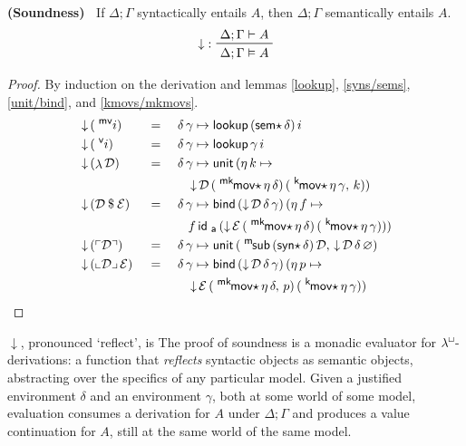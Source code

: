 \documentclass{entcs}
\numberwithin{equation}{thm}
\newcommand{\lambdabox}{\lambda^{\mkern-1mu\sq\mkern-2mu}}
\newcommand{\tsf}[1]{\textsf{\upshape{#1}}}
\newcommand{\stsf}[1]{\tsf{\small{#1}}}
\renewcommand{\:}{\mathrel{:}}
\newcommand{\tyrule}[1]{\prftree[l]{${#1} \:\,$}}
\newcommand{\0}{\varnothing}
\newcommand{\sq}{\Box}
\newcommand{\D}{\mathcal{D}}
\newcommand{\E}{\mathcal{E}}
\renewcommand{\e}{\mathrel{\vdash}}
\newcommand{\mvar}{\operatorname{^{\stsf{mv}\mkern-4mu}}}
\newcommand{\var}{\operatorname{^{\stsf{v}\mkern-4mu}}}
\newcommand{\lam}{\operatorname{\lambda}}
\newcommand{\app}{\mathbin{\$}}
\newcommand{\quo}[1]{\mathopen{\ulcorner}{#1}\mathclose{\urcorner}}
\newcommand{\unq}[1]{\mathopen{\llcorner}{#1}\mathclose{\lrcorner}\,}
\newcommand{\msub}{\operatorname{^{\stsf{m}\mkern-2mu}\tsf{sub}}}
\newcommand{\ida}{\operatorname{\tsf{id}_{\stsf{a}}}}
\newcommand{\syns}{\operatorname{\tsf{syn}\star}}
\newcommand{\sems}{\operatorname{\tsf{sem}\star}}
\newcommand{\eeq}{\mathrel{\vDash}}
\newcommand{\kmovs}{\operatorname{^{\stsf{k}\mkern-2mu}\tsf{mov}\star}}
\newcommand{\mkmovs}{\operatorname{^{\stsf{mk}\mkern-2mu}\tsf{mov}\star}}
\newcommand{\unit}{\operatorname{\tsf{unit}}}
\newcommand{\bind}{\operatorname{\tsf{bind}}}
\newcommand{\lookup}{\operatorname{\tsf{lookup}}}
\newcommand{\reflect}{\operatorname{\downarrow}}
\begin{document}
\begin{theorem}
  \normalshape
  \textbf{(Soundness)\ }
  \label{reflect}
  If $\Delta; \Gamma$ syntactically entails $A$, then $\Delta; \Gamma$ semantically entails $A$.
  \begin{gather*}
    \tyrule{\reflect}{\Delta; \Gamma \e A}{\Delta; \Gamma \eeq A}
  \end{gather*}
  \itshape
  \begin{proof}
    \normalshape
    By induction on the derivation and lemmas \ref{lookup}, \ref{syns/sems}, \ref{unit/bind}, and \ref{kmovs/mkmovs}.
    \begin{alignat}{3}
      \label{reflect.mvar} & \reflect\, (\mvar i)    \,&&=\, &&\,\delta\, \gamma \mapsto \lookup\, (\sems \delta)\, i\\
      \label{reflect.var}  & \reflect\, (\var i)     \,&&=\, &&\,\delta\, \gamma \mapsto \lookup \gamma\, i\\
      \label{reflect.lam}  & \reflect\, (\lam \D)    \,&&=\, &&\,\delta\, \gamma \mapsto \unit\, (\eta\,k \mapsto\\
      \nonumber            & && && \quad \reflect \D\, (\mkmovs \eta\, \delta)\, (\kmovs \eta\, \gamma,\, k))\\
      \label{reflect.app}  & \reflect\, (\D \app \E) \,&&=\, &&\,\delta\, \gamma \mapsto \bind\, (\reflect \D\, \delta\, \gamma)\, (\eta\,f \mapsto\\
      \nonumber            & && && \quad f \ida\, (\reflect \E\, (\mkmovs \eta\, \delta)\, (\kmovs \eta\, \gamma)))\\
      \label{reflect.quo}  & \reflect\, (\quo{\D})   \,&&=\, &&\,\delta\, \gamma \mapsto \unit\, (\msub\, (\syns \delta)\, \D,\, \reflect \D\, \delta\, \0)\\
      \label{reflect.unq}  & \reflect\, (\unq{\D}\E) \,&&=\, &&\,\delta\, \gamma \mapsto \bind\, (\reflect \D\, \delta\, \gamma)\, (\eta\,p \mapsto\\
      \nonumber            & && && \quad \reflect \E\, (\mkmovs \eta\, \delta,\, p)\, (\kmovs \eta\, \gamma))
    \end{alignat}
  \end{proof}
\end{theorem}
\noindent
$\reflect$, pronounced `reflect', is The proof of soundness is a monadic evaluator for $\lambdabox$-derivations: a function that \emph{reflects} syntactic objects as semantic objects, abstracting over the specifics of any particular model.  Given a justified environment $\delta$ and an environment $\gamma$, both at some world of some model, evaluation consumes a derivation for $A$ under $\Delta; \Gamma$ and produces a value continuation for $A$, still at the same world of the same model.
\end{document}
